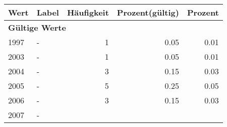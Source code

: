      \begin{longtable}{lXrrr}
     \toprule
     \textbf{Wert} & \textbf{Label} & \textbf{Häufigkeit} & \textbf{Prozent(gültig)} & \textbf{Prozent} \\
     \endhead
     \midrule
     \multicolumn{5}{l}{\textbf{Gültige Werte}}\\

     1997 &
     \multicolumn{1}{X}{ -  } &


       \num{1} &
       \num[round-mode=places,round-precision=2]{0.05} &
         \num[round-mode=places,round-precision=2]{0.01} \\

     2003 &
     \multicolumn{1}{X}{ -  } &


       \num{1} &
       \num[round-mode=places,round-precision=2]{0.05} &
         \num[round-mode=places,round-precision=2]{0.01} \\

     2004 &
     \multicolumn{1}{X}{ -  } &


       \num{3} &
       \num[round-mode=places,round-precision=2]{0.15} &
         \num[round-mode=places,round-precision=2]{0.03} \\

     2005 &
     \multicolumn{1}{X}{ -  } &


       \num{5} &
       \num[round-mode=places,round-precision=2]{0.25} &
         \num[round-mode=places,round-precision=2]{0.05} \\

     2006 &
     \multicolumn{1}{X}{ -  } &


       \num{3} &
       \num[round-mode=places,round-precision=2]{0.15} &
         \num[round-mode=places,round-precision=2]{0.03} \\

     2007 &
     \multicolumn{1}{X}{ -  } &



\end{longtable}
